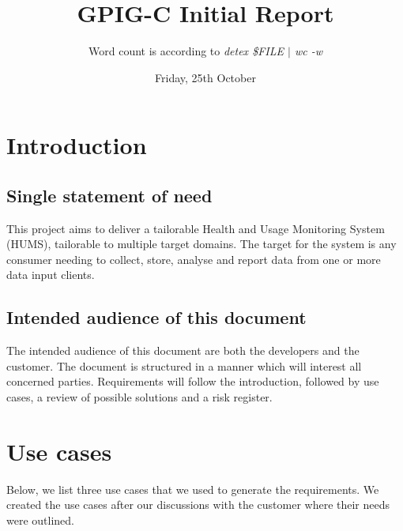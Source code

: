 \documentclass[10pt,a4paper]{article}
\begin{document}
\title{\vspace{-1cm}GPIG-C Initial Report}
\author{Word count is according to
        \textsl{detex \$FILE $\vert$ wc -w}}
\date{Friday, 25th October}
\maketitle
\thispagestyle{fancy} %

\section{Introduction}

\subsection{Single statement of need}
This project aims to deliver a tailorable Health and Usage Monitoring System
(HUMS), tailorable to multiple target domains. The target for the system is any
consumer needing to collect, store, analyse and report data from one or more
data input clients.

\subsection{Intended audience of this document}
The intended audience of this document are both the developers and the customer.
The document is structured in a manner which will interest all concerned
parties. Requirements will follow the introduction, followed by use cases, a
review of possible solutions and a risk register.

\section{Use cases}

Below, we list three use cases that we used to generate the requirements. We
created the use cases after our discussions with the customer where their needs
were outlined.

\vspace{\baselineskip}
\end{document}
